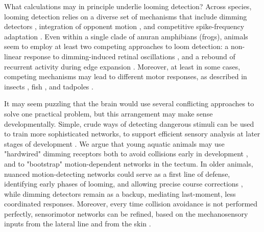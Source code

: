 \documentclass{article}
\begin{document}
What calculations may in principle underlie looming detection? Across species, looming detection relies on a diverse set of mechanisms that include dimming detectors \citep{ishikane2005, munch2009, heap2018dimming}, integration of opponent motion \citep{klapoetke2017looming}, and competitive spike-frequency adaptation \citep{peron2009adaptation, fotowat2011multiplexing}. Even within a single clade of anuran amphibians (frogs), animals seem to employ at least two competing approaches to loom detection: a non-linear response to dimming-induced retinal oscillations \citep{baranauskas2012}, and a rebound of recurrent activity during edge expansion \citep{khakhalin2014, jang2016}. Moreover, at least in some cases, competing mechanisms may lead to different motor responses, as described in insects \citep{card2008tradeoffs, chan2013avoidance}, fish \citep{budick2000repertoire, burgess2007twoescapes, portugues2009behaviors, temizer2015pathway, bhattacharyya2017assessment, heap2018dimming}, and tadpoles \citep{khakhalin2014}.

It may seem puzzling that the brain would use several conflicting approaches to solve one practical problem, but this arrangement may make sense developmentally. Simple, crude ways of detecting dangerous stimuli can be used to train more sophisticated networks, to support efficient sensory analysis at later stages of development \citep{marblestone2016deeplearning, zador2019critique}. We argue that young aquatic animals may use "hardwired" dimming receptors \citep{baranauskas2012, heap2018dimming} both to avoid collisions early in development \citep{dong2009}, and to "bootstrap" motion-dependent networks in the tectum. In older animals, nuanced motion-detecting networks could serve as a first line of defense, identifying early phases of looming, and allowing precise course corrections \citep{khakhalin2014, bhattacharyya2017assessment}, while dimming detectors remain as a backup, mediating last-moment, less coordinated responses. Moreover, every time collision avoidance is not performed perfectly, sensorimotor networks can be refined, based on the mechanosensory inputs from the lateral line and from the skin \citep{felch2016, helmbrecht2018topography}.
\end{document}
